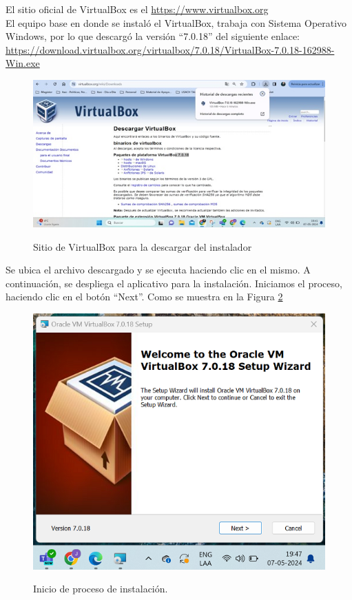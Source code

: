 \documentclass[stu, 11pt, letterpaper, donotrepeattitle, floatsintext, natbib]{apa7}
\begin{document}
El sitio oficial de VirtualBox es el \url{https://www.virtualbox.org} \noindent \citep{virtualbox}\\

El equipo base en donde se instaló el VirtualBox, trabaja con Sistema Operativo Windows, por lo que descargó la versión “7.0.18” del siguiente enlace: \url{https://download.virtualbox.org/virtualbox/7.0.18/VirtualBox-7.0.18-162988-Win.exe }

\begin{figure}[H]
    \centering
    \caption{Sitio de VirtualBox para la descargar del instalador}
    \includegraphics[width=0.6\linewidth]{imagenCap2/1.jpg} %
    \label{fig:OverallEffect}
\end{figure}

Se ubica el archivo descargado y se ejecuta haciendo clic en el mismo. A continuación, se despliega el aplicativo para la instalación. 
Iniciamos el proceso, haciendo clic en el botón “Next”. Como se muestra en la Figura \ref{figura2.2}
\hfill \break

\begin{figure}[H]
    \centering
    \caption{Inicio de proceso de instalación.}
    \includegraphics[width=0.5\linewidth]{imagenCap2/2.png} %
    \label{figura2.2}
\end{figure}
\end{document}
